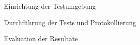 \label{Fallbeispiel}

 \label{Einrichtung der Testumgebung}
 \begin{section}{Einrichtung der Testumgebung}
 \end{section}
 
 \label{Durchführung der Tests und Protokollierung}
 \begin{section}{Durchführung der Tests und Protokollierung}
 \end{section}
 
 \label{Evaluation der Resultate}
 \begin{section}{Evaluation der Resultate}
 \end{section}
 